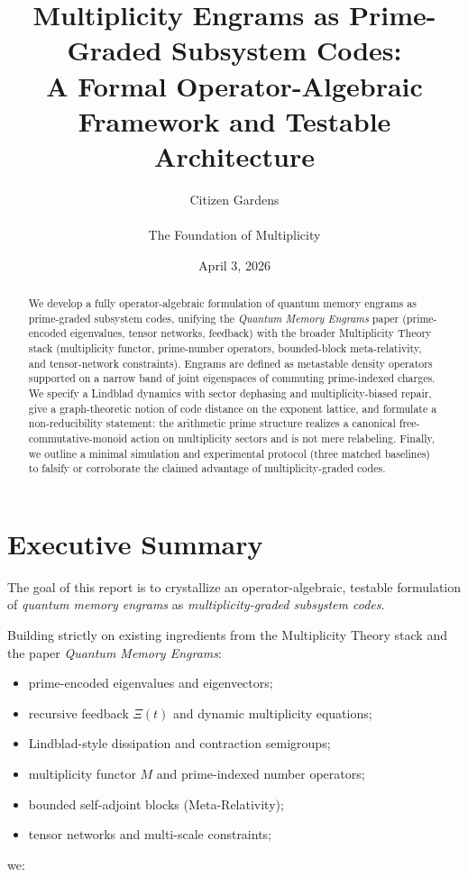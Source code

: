 \documentclass[11pt]{article}
\title{Multiplicity Engrams as Prime-Graded Subsystem Codes:\\
A Formal Operator-Algebraic Framework and Testable Architecture}
\author{Citizen Gardens \\ \\ The Foundation of Multiplicity}
\date{April 3, 2026}
\begin{document}
\maketitle

\begin{abstract}
We develop a fully operator-algebraic formulation of quantum memory engrams as
prime-graded subsystem codes, unifying the \emph{Quantum Memory Engrams} paper
(prime-encoded eigenvalues, tensor networks, feedback) with the broader
Multiplicity Theory stack (multiplicity functor, prime-number operators,
bounded-block meta-relativity, and tensor-network constraints). Engrams are
defined as metastable density operators supported on a narrow band of joint
eigenspaces of commuting prime-indexed charges. We specify a Lindblad
dynamics with sector dephasing and multiplicity-biased repair, give a
graph-theoretic notion of code distance on the exponent lattice, and formulate
a non-reducibility statement: the arithmetic prime structure realizes a
canonical free-commutative-monoid action on multiplicity sectors and is not
mere relabeling. Finally, we outline a minimal simulation and experimental
protocol (three matched baselines) to falsify or corroborate the claimed
advantage of multiplicity-graded codes.
\end{abstract}
\newpage
\tableofcontents

\section{Executive Summary}

The goal of this report is to crystallize an operator-algebraic, testable
formulation of \emph{quantum memory engrams} as \emph{multiplicity-graded
subsystem codes}.

Building strictly on existing ingredients from the Multiplicity Theory stack
and the paper \emph{Quantum Memory Engrams}:
\begin{itemize}[leftmargin=*]
  \item prime-encoded eigenvalues and eigenvectors;
  \item recursive feedback $\Xi(t)$ and dynamic multiplicity equations;
  \item Lindblad-style dissipation and contraction semigroups;
  \item multiplicity functor $M$ and prime-indexed number operators;
  \item bounded self-adjoint blocks (Meta-Relativity);
  \item tensor networks and multi-scale constraints;
\end{itemize}
we:
\end{document}
